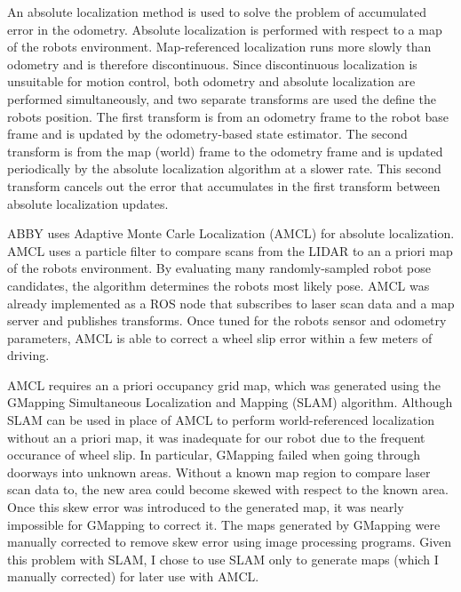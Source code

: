 \documentclass{article}
\begin{document}
An absolute localization method is used to solve the problem of accumulated error in the odometry. Absolute localization is performed with respect to a map of the robot{\textquotesingle}s environment. Map-referenced localization runs more slowly than odometry and is therefore discontinuous. Since discontinuous localization is unsuitable for motion control, both odometry and absolute localization are performed simultaneously, and two separate transforms are used the define the robot{\textquotesingle}s position. The first transform is from an odometry frame to the robot base frame and is updated by the odometry-based state estimator. The second transform is from the map (world) frame to the odometry frame and is updated periodically by the absolute localization algorithm at a slower rate. This second transform cancels out the error that accumulates in the first transform between absolute localization updates.

ABBY uses Adaptive Monte Carle Localization (AMCL)\cite{probabilistic-robotics} for absolute localization. AMCL uses a particle filter to compare scans from the LIDAR to an a priori map of the robot{\textquotesingle}s environment. By evaluating many randomly-sampled robot pose candidates, the algorithm determines the robot{\textquotesingle}s most likely pose. AMCL was already implemented as a ROS node that subscribes to laser scan data and a map server and publishes transforms. Once tuned for the robot{\textquotesingle}s sensor and odometry parameters, AMCL is able to correct a wheel slip error within a few meters of driving.

AMCL requires an a priori occupancy grid map\cite{occ-grid}, which was generated using the GMapping Simultaneous Localization and Mapping (SLAM) algorithm.\cite{gmapping} Although SLAM can be used in place of AMCL to perform world-referenced localization without an a priori map, it was inadequate for our robot due to the frequent occurance of wheel slip. In particular, GMapping failed when going through doorways into unknown areas. Without a known map region to compare laser scan data to, the new area could become skewed with respect to the known area. Once this skew error was introduced to the generated map, it was nearly impossible for GMapping to correct it. The maps generated by GMapping were manually corrected to remove skew error using image processing programs. Given this problem with SLAM, I chose to use SLAM only to generate maps (which I manually corrected) for later use with AMCL.
\end{document}
